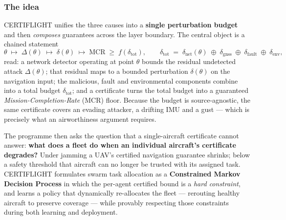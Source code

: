 \documentclass[11pt,a4paper]{article}
\begin{document}
\subsubsection{The idea}
CERTIFLIGHT unifies the three causes into a \textbf{single perturbation budget} and then \emph{composes} guarantees across the layer boundary. The central object is a chained statement
\[
\theta \;\longmapsto\; \Delta(\theta) \;\longmapsto\; \delta(\theta) \;\longmapsto\; \mathrm{MCR} \;\ge\; f\!\left(\delta_{\text{tot}}\right),
\qquad
\delta_{\text{tot}} \;=\; \delta_{\text{net}}(\theta) \;\oplus\; \delta_{\text{gnss}} \;\oplus\; \delta_{\text{fault}} \;\oplus\; \delta_{\text{env}},
\]
read: a network detector operating at point $\theta$ bounds the residual undetected attack $\Delta(\theta)$; that residual maps to a bounded perturbation $\delta(\theta)$ on the navigation input; the malicious, fault and environmental components combine into a total budget $\delta_{\text{tot}}$; and a certificate turns the total budget into a guaranteed \emph{Mission-Completion-Rate} (MCR) floor. Because the budget is source-agnostic, the same certificate covers an evading attacker, a drifting IMU and a gust --- which is precisely what an airworthiness argument requires.

The programme then asks the question that a single-aircraft certificate cannot answer: \textbf{what does a fleet do when an individual aircraft's certificate degrades?} Under jamming a UAV's certified navigation guarantee shrinks; below a safety threshold that aircraft can no longer be trusted with its assigned task. CERTIFLIGHT formulates swarm task allocation as a \textbf{Constrained Markov Decision Process} in which the per-agent certified bound is a \emph{hard constraint}, and learns a policy that dynamically re-allocates the fleet --- rerouting healthy aircraft to preserve coverage --- while provably respecting those constraints during both learning and deployment.
\end{document}
